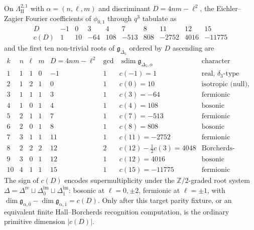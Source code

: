 \begin{proposition}
\label{prop:k3e-fourier-mult-table}
On $\Lambda^{2, 1}_{\mathrm{II}}$ with $\alpha = (n, \ell, m)$ and discriminant $D = 4 n m - \ell^2$, the Eichler--Zagier Fourier coefficients of $\phi_{0, 1}$ through $q^3$ tabulate as
\[
\begin{array}{c|ccccccccc}
D & -1 & 0 & 3 & 4 & 7 & 8 & 11 & 12 & 15 \\ \hline
c(D) & 1 & 10 & -64 & 108 & -513 & 808 & -2752 & 4016 & -11775
\end{array}
\]
and the first ten non-trivial roots of $\mathfrak{g}_{\Delta_5}$ ordered by $D$ ascending are
\[
\renewcommand{\arraystretch}{1.12}
\begin{array}{r|ccc|c|c|l|l}
k & n & \ell & m & D = 4 n m - \ell^2 & \gcd & \operatorname{sdim}\mathfrak g_{\Delta_5,\alpha} & \text{character} \\ \hline
1 & 1 & 1 & 0 & -1 & 1 & c(-1) = 1 & \text{real, } \delta_3\text{-type} \\
2 & 1 & 2 & 1 & 0 & 1 & c(0) = 10 & \text{isotropic (null), bosonic} \\
3 & 1 & 1 & 1 & 3 & 1 & c(3) = -64 & \text{fermionic imaginary} \\
4 & 1 & 0 & 1 & 4 & 1 & c(4) = 108 & \text{bosonic imaginary} \\
5 & 2 & 1 & 1 & 7 & 1 & c(7) = -513 & \text{fermionic imaginary} \\
6 & 2 & 0 & 1 & 8 & 1 & c(8) = 808 & \text{bosonic imaginary} \\
7 & 3 & 1 & 1 & 11 & 1 & c(11) = -2752 & \text{fermionic imaginary} \\
8 & 2 & 2 & 2 & 12 & 2 & c(12) - \tfrac{1}{2} c(3) = 4048 & \text{Borcherds-summed} \\
9 & 3 & 0 & 1 & 12 & 1 & c(12) = 4016 & \text{bosonic imaginary} \\
10 & 4 & 1 & 1 & 15 & 1 & c(15) = -11775 & \text{fermionic imaginary}
\end{array}
\]
The sign of $c(D)$ encodes supermultiplicity under the $\mathbb{Z}/2$-graded root system $\Delta = \Delta^{\mathrm{re}} \sqcup \Delta^{\mathrm{im}}_{\bar 0} \sqcup \Delta^{\mathrm{im}}_{\bar 1}$: bosonic at $\ell = 0, \pm 2$, fermionic at $\ell = \pm 1$, with $\dim \mathfrak{g}_{\alpha, \bar 0} - \dim \mathfrak{g}_{\alpha, \bar 1} = c(D)$. Only after this target parity fixture, or an equivalent finite Hall--Borcherds recognition computation, is the ordinary primitive dimension \(|c(D)|\).
\end{proposition}

